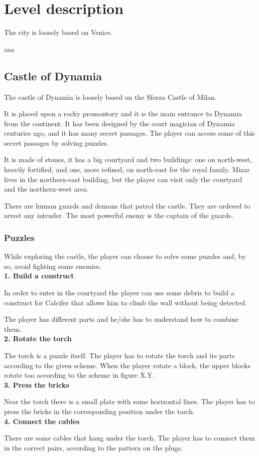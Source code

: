 \section{Level description}

The city is loosely based on Venice.

aaa

\subsection{Castle of Dynamia}
The castle of Dynamia is loosely based on the Sforza Castle of Milan.

It is placed upon a rocky promontory and it is the main entrance to Dynamia from the continent. It has been designed by the court magician of Dynamia centuries ago, and it has many secret passages. The player can access some of this secret passages by solving puzzles.

It is made of stones, it has a big courtyard and two buildings: one on north-west, heavily fortified, and one, more refined, on north-east for the royal family. Mizar lives in the northern-east building, but the player can visit only the courtyard and the northern-west area.

There are human guards and demons that patrol the castle. They are ordered to arrest any intruder. The most powerful enemy is the captain of the guards.

\subsubsection{Puzzles}
While exploring the castle, the player can choose to solve some puzzles and, by so, avoid fighting some enemies. \\

\textbf{1. Build a construct}

In order to enter in the courtyard the player can use some debris to build a construct for Calcifer that allows him to climb the wall without being detected.

The player has different parts and he/she has to understand how to combine them.\\

\textbf{2. Rotate the torch}

The torch is a puzzle itself. The player has to rotate the torch and its parts according to the given scheme. When the player rotate a block, the upper blocks rotate too according to the scheme in figure X.Y.\\

\textbf{3. Press the bricks}

Near the torch there is a small plate with some horizontal lines. The player has to press the bricks in the corresponding position under the torch.\\

\textbf{4. Connect the cables}

There are some cables that hang under the torch. The player has to connect them in the correct pairs, according to the pattern on the plugs.
